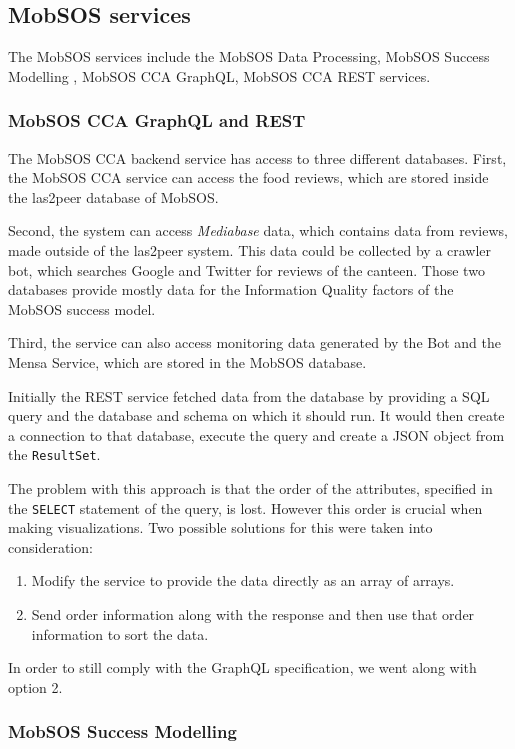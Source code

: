 \subsection{MobSOS services}
The MobSOS services include the MobSOS Data Processing, MobSOS Success Modelling , MobSOS CCA GraphQL, MobSOS CCA REST services.

\subsubsection{MobSOS CCA GraphQL and REST}
The MobSOS CCA backend service has access to three different databases. First, the MobSOS CCA service can access the food reviews, which are stored inside the las2peer database of MobSOS.

Second, the system can access \emph{Mediabase} data, which contains data from reviews, made outside of the las2peer system. 
This data could be collected by a crawler bot, which searches Google and Twitter for reviews of the canteen. 
Those two databases provide mostly data for the Information Quality factors of the MobSOS success model.

Third, the service can also access monitoring data generated by the Bot and the Mensa Service, which are stored in the MobSOS database. 

Initially the REST service fetched data from the database by providing a SQL query and the database and schema on which it should run. It would then create a connection to that database, execute the query and create a JSON object from the \texttt{ResultSet}. 

The problem with this approach is that the order of the attributes, specified in the \texttt{SELECT} statement of the query, is lost.
However this order is crucial when making visualizations. 
Two possible solutions for this were taken into consideration:
\begin{enumerate}
    \item Modify the service to provide the data directly as an array of arrays.
    \item Send order information along with the response and then use that order information to sort the data.
\end{enumerate}
In order to still comply with the GraphQL specification, we went along with option 2. 




\subsubsection{MobSOS Success Modelling}


